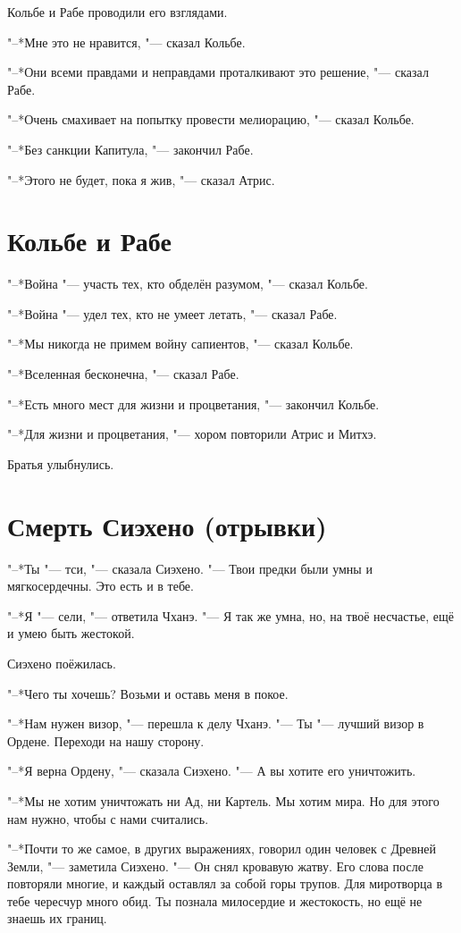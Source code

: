 Кольбе и Рабе проводили его взглядами.

"--*Мне это не нравится, "--- сказал Кольбе.

"--*Они всеми правдами и неправдами проталкивают это решение, "--- сказал Рабе.

"--*Очень смахивает на попытку провести мелиорацию, "--- сказал Кольбе.

"--*Без санкции Капитула, "--- закончил Рабе.

"--*Этого не будет, пока я жив, "--- сказал Атрис.

\section{Кольбе и Рабе}

"--*Война "--- участь тех, кто обделён разумом, "--- сказал Кольбе.

"--*Война "--- удел тех, кто не умеет летать, "--- сказал Рабе.

"--*Мы никогда не примем войну сапиентов, "--- сказал Кольбе.

"--*Вселенная бесконечна, "--- сказал Рабе.

"--*Есть много мест для жизни и процветания, "--- закончил Кольбе.

"--*Для жизни и процветания, "--- хором повторили Атрис и Митхэ.

Братья улыбнулись.

\section{Смерть Сиэхено (отрывки)}

"--*Ты "--- тси, "--- сказала Сиэхено.
"--- Твои предки были умны и мягкосердечны.
Это есть и в тебе.

"--*Я "--- сели, "--- ответила Чханэ.
"--- Я так же умна, но, на твоё несчастье, ещё и умею быть жестокой.

Сиэхено поёжилась.

"--*Чего ты хочешь?
Возьми и оставь меня в покое.

"--*Нам нужен визор, "--- перешла к делу Чханэ.
"--- Ты "--- лучший визор в Ордене.
Переходи на нашу сторону.

"--*Я верна Ордену, "--- сказала Сиэхено.
"--- А вы хотите его уничтожить.

"--*Мы не хотим уничтожать ни Ад, ни Картель.
Мы хотим мира.
Но для этого нам нужно, чтобы с нами считались.

"--*Почти то же самое, в других выражениях, говорил один человек с Древней Земли, "--- заметила Сиэхено.
"--- Он снял кровавую жатву.
Его слова после повторяли многие, и каждый оставлял за собой горы трупов.
Для миротворца в тебе чересчур много обид.
Ты познала милосердие и жестокость, но ещё не знаешь их границ.

